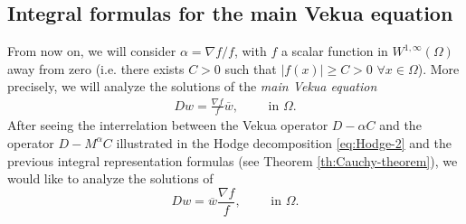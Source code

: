 \documentclass[12pt]{article}
\newcommand{\comment}[1]{\marginpar{\hfuzz=5ex
\scriptsize$\stackrel{?}{\longleftarrow}$\\\hspace*{-3ex}
{\fbox{\parbox{20ex}{\hfuzz=15ex \raggedright\sf#1 }}} }}
\begin{document}
\subsection{Integral formulas for the main Vekua equation}\label{subsec:main-Vekua}
From now on, we will consider $\alpha=\nabla f/f$,  with $f$ a scalar function in $W^{1,\infty}(\Omega)$ away from zero (i.e. there exists $C>0$ such that $|f(x)|\geq C>0$ $\forall x\in \Omega$). More precisely, we will analyze the solutions of the \textit{main Vekua equation}
\begin{align}\label{eq:main-Vekua}
 Dw=\frac{\nabla f}{f}\overline{w}, \qquad \text{ in }\Omega.
\end{align}
After seeing the interrelation between the Vekua operator $D-\alpha C$ and the operator $D-M^{\alpha}C$ illustrated in the Hodge decomposition \eqref{eq:Hodge-2} and the previous integral representation formulas (see Theorem \ref{th:Cauchy-theorem}), we would like to analyze the solutions of
\begin{equation}\label{eq:Vekua-adjoint}
  Dw=\overline{w}\frac{\nabla f}{f}, \qquad \text{ in }\Omega.    
\end{equation}
\end{document}
